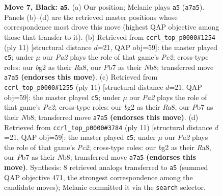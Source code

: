 \documentclass[11pt]{article}
\begin{document}
\begin{figure}[p]
\caption{\textbf{Move 7, Black: \texttt{a5}.} (a) Our position; Melanie plays \texttt{a5} (\texttt{a7a5}). Panels (b)--(d) are the retrieved master positions whose correspondence most drove this move (highest QAP objective among those that transfer to it). (b) Retrieved from \texttt{ccrl\_top\_p0000\#1254} (ply 11) [structural distance $d$=21, QAP obj=59]: the master played \texttt{c5}; under $\mu$ our \emph{Pa2} plays the role of that game's \emph{Pc2}; cross-type roles: our \emph{b}g2 as their \emph{R}a8, our \emph{P}b7 as their \emph{N}b8; transferred move \texttt{a7a5} \textbf{(endorses this move)}. (c) Retrieved from \texttt{ccrl\_top\_p0000\#1255} (ply 11) [structural distance $d$=21, QAP obj=59]: the master played \texttt{c5}; under $\mu$ our \emph{Pa2} plays the role of that game's \emph{Pc2}; cross-type roles: our \emph{b}g2 as their \emph{R}a8, our \emph{P}b7 as their \emph{N}b8; transferred move \texttt{a7a5} \textbf{(endorses this move)}. (d) Retrieved from \texttt{ccrl\_top\_p0000\#3784} (ply 11) [structural distance $d$=21, QAP obj=59]: the master played \texttt{c5}; under $\mu$ our \emph{Pa2} plays the role of that game's \emph{Pc2}; cross-type roles: our \emph{b}g2 as their \emph{R}a8, our \emph{P}b7 as their \emph{N}b8; transferred move \texttt{a7a5} \textbf{(endorses this move)}. Synthesis: 8 retrieved analogs transferred to \texttt{a5} (summed QAP objective 471, the strongest correspondence among the candidate moves); Melanie committed it via the \texttt{search} selector.}
\label{fig:thought-m13}
\end{figure}

\clearpage
\end{document}
